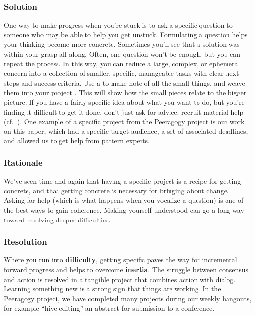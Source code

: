 \subsubsection*{Solution} 
One way to make progress when you're stuck is to ask a specific question to someone who may be able to help you get unstuck. Formulating a question helps your thinking become more concrete. Sometimes you'll see that a solution was within your grasp all along.  Often, one question won't be enough, but you can repeat the process. In this way, you can reduce a large, complex, or ephemeral concern into a collection of smaller, specific, manageable tasks with clear next steps and success criteria. Use a  to make note of all the small things, and weave them into your project . This will show how the small pieces relate to the bigger picture. If you have a fairly specific idea about what you want to do, but you're finding it difficult to get it done, don't just ask for advice: recruit material help (cf.~). One example of a specific project from the Peeragogy project is our work on this paper, which had a specific target audience, a set of associated deadlines, and allowed us to get help from pattern experts. 

\subsubsection*{Rationale} 
We've seen time and again that having a specific project is a recipe for getting concrete, and that getting concrete is necessary for bringing about change. Asking for help (which is what happens when you vocalize a question) is one of the best ways to gain coherence. Making yourself understood can go a long way toward resolving deeper difficulties.

\subsubsection*{Resolution}
Where you run into \textbf{difficulty}, getting specific paves the way for incremental forward progress and helps to overcome \textbf{inertia}. The struggle between consensus and action is resolved in a tangible project that combines action with dialog. Learning something new is a strong sign that things are working.
In the Peeragogy project, we have completed many projects during our weekly hangouts, for example ``hive editing'' an abstract for submission to a conference.

